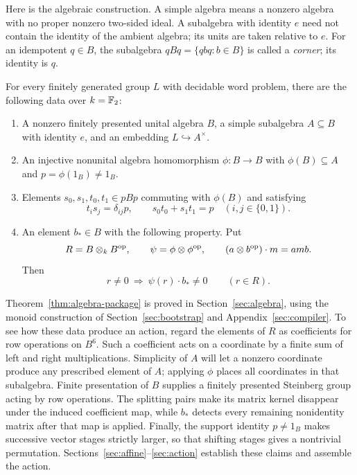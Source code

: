 Here is the algebraic construction. A simple algebra means a nonzero
algebra with no proper nonzero two-sided ideal. A subalgebra with identity
\(e\) need not contain the identity of the ambient algebra; its units
are taken relative to \(e\). For an idempotent \(q\in B\), the
subalgebra \(qBq=\{qbq:b\in B\}\) is called a \emph{corner};
its identity is \(q\).

\begin{theorem}\label{thm:algebra-package}
For every finitely generated group \(L\) with decidable word problem,
there are the following data over \(k=\mathbb F_2\):
\begin{enumerate}[label=\textup{(\roman*)}]
\item A nonzero finitely presented unital algebra \(B\), a simple
subalgebra \(A\subseteq B\) with identity \(e\), and an embedding
\(L\hookrightarrow A^\times\).
\item An injective nonunital algebra homomorphism \(\phi:B\to B\) with
\(\phi(B)\subseteq A\) and \({p=\phi(1_B)\ne1_B}\).
\item Elements \(s_0,s_1,t_0,t_1\in pBp\) commuting with \(\phi(B)\)
and satisfying
\[
 t_i s_j=\delta_{ij}p,\qquad s_0t_0+s_1t_1=p
 \quad(i,j\in\{0,1\}).
\]
\item An element \(b_*\in B\) with the following property. Put
\[
 R=B\otimes_k B^{\mathrm{op}},\qquad
 \psi=\phi\otimes\phi^{\mathrm{op}},
 \qquad (a\otimes b^{\mathrm{op}})\cdot m=amb.
\]
Then
\[
 r\ne0\ \Longrightarrow\ \psi(r)\cdot b_*\ne0
 \qquad(r\in R).
\]
\end{enumerate}
\end{theorem}

Theorem~\ref{thm:algebra-package} is proved in
Section~\ref{sec:algebra}, using the monoid construction of
Section~\ref{sec:bootstrap} and Appendix~\ref{sec:compiler}.
To see how these data produce an action, regard the elements of \(R\)
as coefficients for row operations on \(B^6\). Such a coefficient
acts on a coordinate by a finite sum of left and right multiplications.
Simplicity of \(A\) will let a nonzero coordinate produce any prescribed
element of \(A\); applying \(\phi\) places all coordinates in that
subalgebra. Finite presentation of \(B\) supplies a finitely presented
Steinberg group acting by row operations. The splitting pairs make its matrix
kernel disappear under the induced coefficient map, while \(b_*\)
detects every remaining nonidentity matrix after that map is applied.
Finally, the support identity \(p\ne1_B\) makes successive vector
stages strictly larger, so that shifting stages gives a nontrivial
permutation. Sections~\ref{sec:affine}--\ref{sec:action} establish these
claims and assemble the action.

